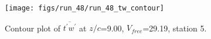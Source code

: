 \begin{figure}[H]
\centering
\texttt{[image: figs/run\_48/run\_48\_tw\_contour]}
\caption{Contour plot of $\overline{t^\prime w^\prime}$ at $z/c$=9.00, $V_{free}$=29.19, station 5.}
\end{figure}


